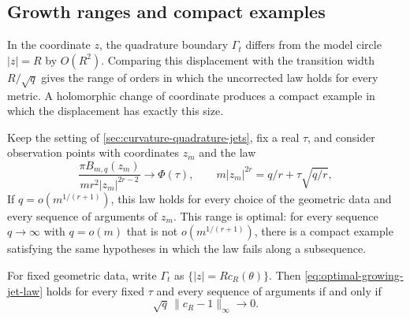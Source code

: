\subsection{Growth ranges and compact examples}
\label{sec:optimal-growing-jet-ranges}

In the coordinate $z$, the quadrature boundary $\Gamma_t$ differs from the model circle $|z|=R$ by $O(R^2)$. Comparing this displacement with the transition width $R/\sqrt q$ gives the range of orders in which the uncorrected law holds for every metric. A holomorphic change of coordinate produces a compact example in which the displacement has exactly this size.

\begin{theorem}\label{thm:optimal-growing-jet-range}
Keep the setting of \cref{sec:curvature-quadrature-jets}, fix a real $\tau$, and consider observation points with coordinates $z_m$ and the law
\begin{equation}\label{eq:optimal-growing-jet-law}
 \frac{\pi B_{m,q}(z_m)}{mr^2|z_m|^{2r-2}}
 \longrightarrow\Phi(\tau),\qquad
 m|z_m|^{2r}=q/r+\tau\sqrt{q/r},
\end{equation}
If $q=o(m^{1/(r+1)})$, this law holds for every choice of the geometric data and every sequence of arguments of $z_m$. This range is optimal: for every sequence $q\to\infty$ with $q=o(m)$ that is not $o(m^{1/(r+1)})$, there is a compact example satisfying the same hypotheses in which the law fails along a subsequence.

For fixed geometric data, write $\Gamma_t$ as $\{|z|=R c_R(\theta)\}$. Then \eqref{eq:optimal-growing-jet-law} holds for every fixed $\tau$ and every sequence of arguments if and only if
\begin{equation}\label{eq:fixed-weight-jet-criterion}
 \sqrt q\,\|c_R-1\|_\infty\longrightarrow0.
\end{equation}
\end{theorem}
